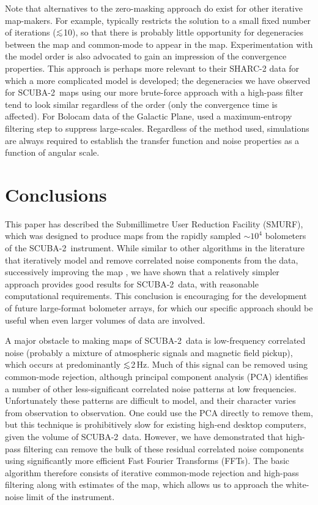 \documentclass[useAMS,usenatbib,nofootinbib]{mn2e}
\newcommand{\scuba}{SCUBA-2}
\def\lsim{\mathrel{\lower2.5pt\vbox{\lineskip=0pt\baselineskip=0pt
          \hbox{$<$}\hbox{$\sim$}}}}
\begin{document}
Note that alternatives to the zero-masking approach do exist for other
iterative map-makers. For example, \citet{kovacs2008} typically
restricts the solution to a small fixed number of iterations
($\lsim$10), so that there is probably little opportunity for
degeneracies between the map and common-mode to appear in the map.
Experimentation with the model order is also advocated to gain an
impression of the convergence properties. This approach is perhaps
more relevant to their SHARC-2 data for which a more complicated model
is developed; the degeneracies we have observed for \scuba\ maps using
our more brute-force approach with a high-pass filter tend to look
similar regardless of the order (only the convergence time is
affected).  For Bolocam data of the Galactic Plane,
\citet{aguirre2011} used a maximum-entropy filtering step to suppress
large-scales. Regardless of the method used, simulations are always
required to establish the transfer function and noise properties as a
function of angular scale.


\section{Conclusions}
\label{sec:conclusions}

This paper has described the Submillimetre User Reduction Facility
(SMURF), which was designed to produce maps from the rapidly sampled
$\sim10^4$ bolometers of the \scuba\ instrument. While similar to
other algorithms in the literature that iteratively model and remove
correlated noise components from the data, successively improving the
map \citep[e.g.,][]{kovacs2008,aguirre2011,schuller2012}, we have shown
that a relatively simpler approach provides good results for \scuba\
data, with reasonable computational requirements. This conclusion is
encouraging for the development of future large-format bolometer
arrays, for which our specific approach should be useful when even
larger volumes of data are involved.

A major obstacle to making maps of \scuba\ data is low-frequency
correlated noise (probably a mixture of atmospheric signals and
magnetic field pickup), which occurs at predominantly $\lsim$2\,Hz.
Much of this signal can be removed using common-mode rejection,
although principal component analysis (PCA) identifies a number of
other less-significant correlated noise patterns at low
frequencies. Unfortunately these patterns are difficult to model, and
their character varies from observation to observation. One could use
the PCA directly to remove them, but this technique is prohibitively
slow for existing high-end desktop computers, given the volume of
\scuba\ data. However, we have demonstrated that high-pass filtering
can remove the bulk of these residual correlated noise components
using significantly more efficient Fast Fourier Transforms (FFTs). The
basic algorithm therefore consists of iterative common-mode rejection
and high-pass filtering along with estimates of the map, which allows
us to approach the white-noise limit of the instrument.
\end{document}
